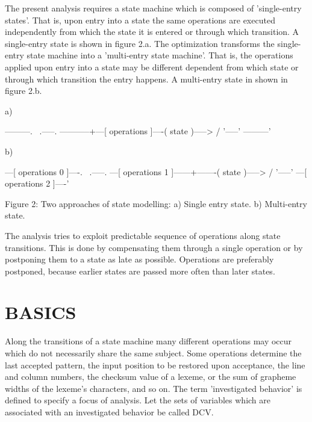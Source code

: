 \documentclass[12pt]{article}
\begin{document}
The present analysis requires a state machine which is composed of
'single-entry states'. That is, upon entry into a state the same operations are
executed independently from which the state it is entered or through which
transition.  A single-entry state is shown in figure 2.a. The optimization
transforms the single-entry state machine into a 'multi-entry state machine'.
That is, the operations applied upon entry into a state may be different
dependent from which state or through which transition the entry happens.  A
multi-entry state in shown in figure 2.b.

           a)
     
                  ---------.
                            \                       .-----.
                  -----------+---[ operations ]----( state )----->   
                            /                       '-----'
                  ---------'       
     
           b)
     
                  ---[ operations 0 ]----.
                                          \         .-----.
                  ---[ operations 1 ]------+-------( state )----->  
                                          /         '-----'
                  ---[ operations 2 ]----'       


      Figure 2: Two approaches of state modelling: a) Single entry state. 
                b) Multi-entry state. 
                
The analysis tries to exploit predictable sequence of operations along state
transitions. This is done by compensating them through a single operation or by
postponing them to a state as late as possible.  Operations are preferably
postponed, because earlier states are passed more often than later states.

\section{BASICS}

Along the transitions of a state machine many different operations may occur
which do not necessarily share the same subject. Some operations determine the
last accepted pattern, the input position to be restored upon acceptance, the
line and column numbers, the checksum value of a lexeme, or the sum of grapheme
widths of the lexeme's characters, and so on. The term 'investigated behavior'
is defined to specify a focus of analysis.  Let the sets of variables which are
associated with an investigated behavior be called DCV.
\end{document}
